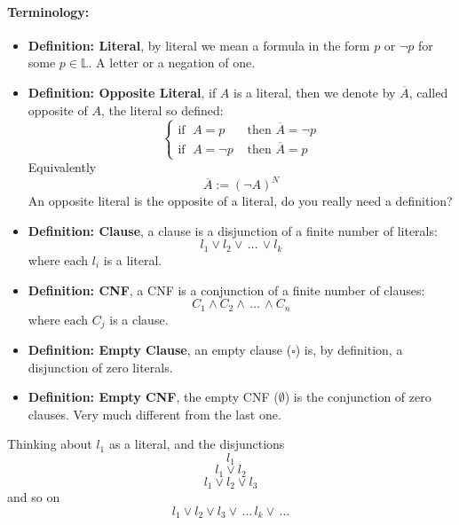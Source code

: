 \documentclass[11pt]{article}
\begin{document}
	\paragraph{Terminology: }
	\begin{itemize}
		\item \textbf{Definition: Literal}, by literal we mean a formula in the form $p$ or $\neg p$ for some $p \in \mathbb{L}$. A letter or a negation of one.\\
		
		\item \textbf{Definition: Opposite Literal}, if $A$ is a literal, then we denote by $\overline{A}$, called opposite of $A$, the literal so defined:
		$$ 
		\begin{cases}
			\text{if } \; A = p & \text{ then } \overline{A} = \neg p \\
			\text{if } \; A = \neg p & \text{ then } \overline{A} = p
		\end{cases}
		$$
		Equivalently
		$$ \overline{A} := (\neg A)^N$$
		An opposite literal is the opposite of a literal, do you really need a definition?\\
		
		\item \textbf{Definition: Clause}, a clause is a disjunction of a finite number of literals: 
		$$ l_1 \vee l_2 \vee \, \dots \, \vee l_k $$
		where each $l_i$ is a literal.\\
		
		\item \textbf{Definition: CNF}, a CNF is a conjunction of a finite number of clauses: 
		$$ C_1 \wedge C_2 \wedge \, \dots \, \wedge C_n$$
		where each $C_j$ is a clause.\\
		
		\item \textbf{Definition: Empty Clause}, an empty clause ($\square$) is, by definition, a disjunction of zero literals.\\
		
		\item \textbf{Definition: Empty CNF}, the empty CNF ($\emptyset$) is the conjunction of zero clauses. Very much different from the last one.\\
	\end{itemize}
	
	Thinking about $l_1$ as a literal, and the disjunctions 
	$$ l_1 $$
	$$ l_1 \vee l_2 $$
	$$ l_1 \vee l_2 \vee l_3 $$
	and so on
	$$ l_1 \vee l_2 \vee l_3 \vee \, \dots \, l_k \vee \, \dots $$
	
\end{document}
